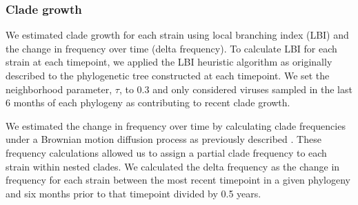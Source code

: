 \subsubsection*{Clade growth}

We estimated clade growth for each strain using local branching index (LBI) and the change in frequency over time (delta frequency).
To calculate LBI for each strain at each timepoint, we applied the LBI heuristic algorithm as originally described \cite{Neher:2014eu} to the phylogenetic tree constructed at each timepoint.
We set the neighborhood parameter, $\tau$, to 0.3 and only considered viruses sampled in the last 6 months of each phylogeny as contributing to recent clade growth.

We estimated the change in frequency over time by calculating clade frequencies under a Brownian motion diffusion process as previously described \cite{Lee2018}.
These frequency calculations allowed us to assign a partial clade frequency to each strain within nested clades.
We calculated the delta frequency as the change in frequency for each strain between the most recent timepoint in a given phylogeny and six months prior to that timepoint divided by 0.5 years.
